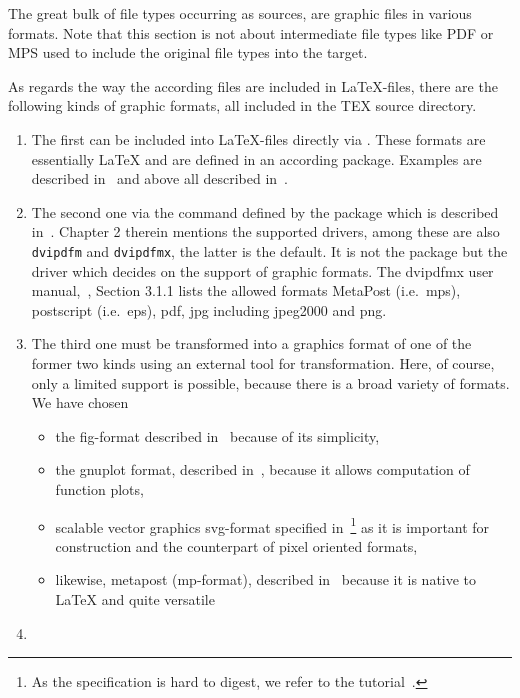 The great bulk of file types occurring as sources, 
are graphic files in various formats. 
Note that this section is not about intermediate file types like PDF or MPS 
used to include the original file types into the target. 

As regards the way the according files are included in \LaTeX-files, 
there are the following kinds of graphic formats, 
all included in the TEX source directory. 
%
\begin{enumerate}
\item
The first can be included into \LaTeX-files directly via . 
These formats are essentially \LaTeX{}
and are defined in an according package. 
Examples are  described in~\cite{EEpic}
and above all  described in~\cite{TikzPGF}. 
\item
The second one via the command  
defined by the package  
which is described in~\cite{GraX}. 
Chapter 2 therein mentions the supported drivers, 
among these are also \texttt{dvipdfm} and \texttt{dvipdfmx}, the latter is the default. 
It is not the package but the driver 
which decides on the support of graphic formats. 
The dvipdfmx user manual,~\cite{DviPdfMx}, Section 3.1.1 lists the allowed formats 
MetaPost (i.e.~\gls{mps}), postscript (i.e.~\gls{eps}), 
\gls{pdf}, \gls{jpg} including jpeg2000 and \gls{png}. 
\item\label{it:transExp}
The third one must be transformed into a graphics format 
of one of the former two kinds using an external tool for transformation. 
Here, of course, only a limited support is possible, 
because there is a broad variety of formats. 
We have chosen
%
\begin{itemize}
\item
  the \gls{fig}-format described in~\cite{XFigF}
  because of its simplicity, 
\item
  the gnuplot format, described in~\cite{GnuPlot}, 
  because it allows computation of function plots, 
\item
  scalable vector graphics \gls{svg}-format specified in~\cite{Svg11}\footnote%
  { As the specification is hard to digest,
  we refer to the tutorial~\cite{SvgTut}. } 
  as it is important for construction and the counterpart of pixel oriented
  formats,
\item
  likewise, metapost (\gls{mp}-format),
  described in~\cite{MPost} because it is native to \LaTeX{} 
  and quite versatile 
\end{itemize}
\item\label{it:transImp}

\end{enumerate}
